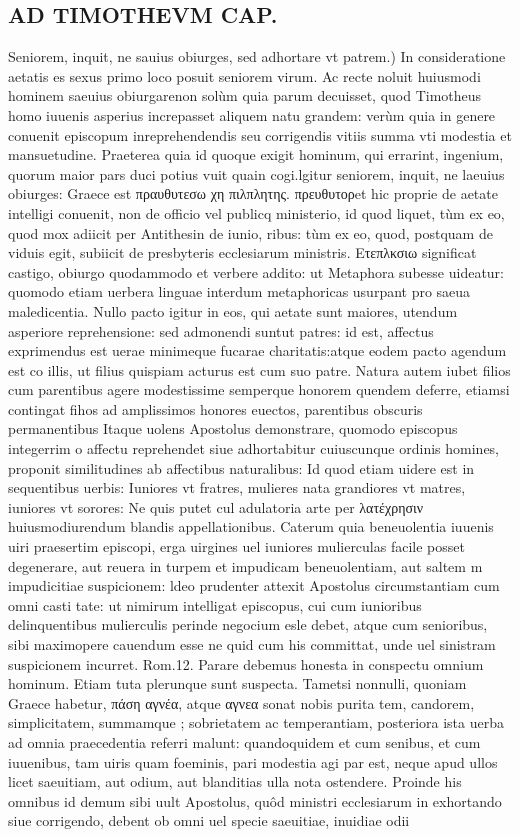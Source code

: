 \documentclass{article}
\begin{document}
\begin{pages}
\section*{AD TIMOTHEVM CAP. }
\marginpar{[ p.104 ]}\pstart Seniorem, inquit, ne sauius obiurges, sed adhortare vt patrem.) In consideratione aetatis es sexus primo loco posuit seniorem virum. Ac recte noluit huiusmodi hominem saeuius obiurgarenon solùm quia parum decuisset, quod Timotheus homo iuuenis asperius increpasset aliquem natu grandem: verùm quia in genere conuenit episcopum inreprehendendis seu corrigendis vitiis summa vti modestia et mansuetudine. Praeterea quia id quoque exigit hominum, qui errarint, ingenium, quorum maior pars duci potius vuit quain cogi.lgitur seniorem, inquit, ne laeuius obiurges: Graece est πραυθυτεσω χη πιλπλητης. πρευθυτορet hic proprie de aetate intelligi conuenit, non de officio vel publicq ministerio, id quod liquet, tùm ex eo, quod mox adiicit per Antithesin de iunio, ribus: tùm ex eo, quod, postquam de viduis egit, subiicit de presbyteris ecclesiarum ministris. Ετεπλκσιω significat castigo, obiurgo quodammodo et verbere addito: ut Metaphora subesse uideatur: quomodo etiam uerbera linguae interdum metaphoricas usurpant pro saeua maledicentia. Nullo pacto igitur in eos, qui aetate sunt maiores, utendum asperiore reprehensione: sed admonendi suntut patres: id est, affectus exprimendus est uerae minimeque fucarae charitatis:atque eodem pacto agendum est co illis, ut filius quispiam acturus est cum suo patre. Natura autem iubet filios cum parentibus agere modestissime semperque honorem quendem deferre, etiamsi contingat fihos ad amplissimos honores euectos, parentibus obscuris permanentibus Itaque uolens Apostolus demonstrare, quomodo episcopus integerrim o affectu reprehendet siue adhortabitur cuiuscunque ordinis homines, proponit similitudines ab affectibus naturalibus: Id quod etiam uidere est in sequentibus uerbis: Iuniores vt fratres, mulieres nata grandiores vt matres, iuniores vt sorores: Ne quis putet cul adulatoria arte per λατέχρησιν huiusmodiurendum blandis appellationibus. Caterum quia beneuolentia iuuenis uiri praesertim episcopi, erga uirgines uel iuniores mulierculas facile posset degenerare, aut reuera in turpem et impudicam beneuolentiam, aut saltem m impudicitiae suspicionem: ldeo prudenter attexit Apostolus circumstantiam cum omni casti tate: ut nimirum intelligat episcopus, cui cum iunioribus delinquentibus mulierculis perinde negocium esle debet, atque cum senioribus, sibi maximopere cauendum esse ne quid cum his committat, unde uel sinistram suspicionem incurret. Rom.12. Parare debemus honesta in conspectu omnium hominum. Etiam tuta plerunque sunt suspecta. Tametsi nonnulli, quoniam Graece habetur, πάση αγνέα, atque αγνεα sonat nobis purita tem, candorem, simplicitatem, summamque ; sobrietatem ac temperantiam, posteriora ista uerba ad omnia praecedentia referri malunt: quandoquidem et cum senibus, et cum iuuenibus, tam uiris quam foeminis, pari modestia agi par est, neque apud ullos licet saeuitiam, aut odium, aut blanditias ulla nota ostendere. Proinde his omnibus id demum sibi uult Apostolus, quôd ministri ecclesiarum in exhortando siue corrigendo, debent ob omni uel specie saeuitiae, inuidiae odii 
\end{pages}
\end{document}
